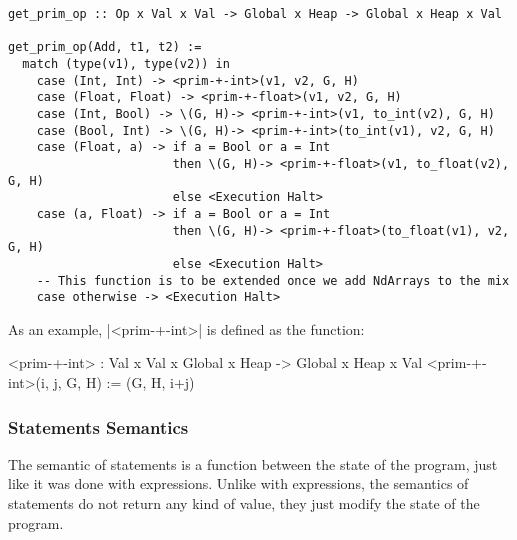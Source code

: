 \begin{verbatim}
get_prim_op :: Op x Val x Val -> Global x Heap -> Global x Heap x Val

get_prim_op(Add, t1, t2) :=
  match (type(v1), type(v2)) in
    case (Int, Int) -> <prim-+-int>(v1, v2, G, H)
    case (Float, Float) -> <prim-+-float>(v1, v2, G, H)
    case (Int, Bool) -> \(G, H)-> <prim-+-int>(v1, to_int(v2), G, H)
    case (Bool, Int) -> \(G, H)-> <prim-+-int>(to_int(v1), v2, G, H)
    case (Float, a) -> if a = Bool or a = Int
                       then \(G, H)-> <prim-+-float>(v1, to_float(v2), G, H)
                       else <Execution Halt>
    case (a, Float) -> if a = Bool or a = Int
                       then \(G, H)-> <prim-+-float>(to_float(v1), v2, G, H)
                       else <Execution Halt>
    -- This function is to be extended once we add NdArrays to the mix
    case otherwise -> <Execution Halt>
\end{verbatim}

As an example, \pycode|<prim-+-int>| is defined as the function:

\begin{pythoncode}
<prim-+-int> : Val x Val x Global x Heap -> Global x Heap x Val
<prim-+-int>(i, j, G, H) := (G, H, i+j)
\end{pythoncode}

\subsubsection*{Statements Semantics}

The semantic of statements is a function between the state of the
program, just like it was done with expressions. Unlike with expressions,
the semantics of statements do not return any kind of value, they just
modify the state of the program.

